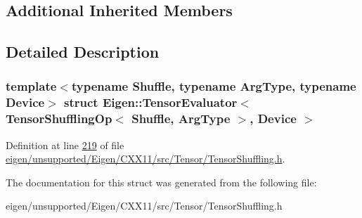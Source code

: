 \subsection*{Additional Inherited Members}


\subsection{Detailed Description}
\subsubsection*{template$<$typename Shuffle, typename Arg\+Type, typename Device$>$\newline
struct Eigen\+::\+Tensor\+Evaluator$<$ Tensor\+Shuffling\+Op$<$ Shuffle, Arg\+Type $>$, Device $>$}



Definition at line \hyperlink{eigen_2unsupported_2_eigen_2_c_x_x11_2src_2_tensor_2_tensor_shuffling_8h_source_l00219}{219} of file \hyperlink{eigen_2unsupported_2_eigen_2_c_x_x11_2src_2_tensor_2_tensor_shuffling_8h_source}{eigen/unsupported/\+Eigen/\+C\+X\+X11/src/\+Tensor/\+Tensor\+Shuffling.\+h}.



The documentation for this struct was generated from the following file\+:\begin{DoxyCompactItemize}
\item 
eigen/unsupported/\+Eigen/\+C\+X\+X11/src/\+Tensor/\+Tensor\+Shuffling.\+h\end{DoxyCompactItemize}
